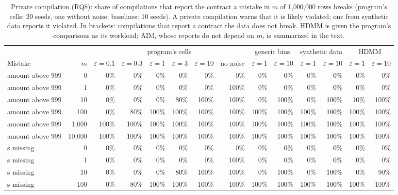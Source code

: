 \begin{table}[t]
\caption{Private compilation (RQ8): share of compilations that report the contract a mistake in $m$ of 1{,}000{,}000 rows breaks (program's cells: 20 seeds, one without noise; baselines: 10 seeds). A private compilation warns that it is likely violated; one from synthetic data reports it violated. In brackets: compilations that report a contract the data does not break. HDMM is given the program's comparisons as its workload; AIM, whose reports do not depend on $m$, is summarized in the text.}
\label{tab:rq-private-diag}
\centering
\footnotesize
\begin{adjustbox}{max width=\linewidth}
\begin{tabular}{@{}lrrrrrrrrrrrrr@{}}
\toprule
 & & \multicolumn{6}{c}{program's cells} & \multicolumn{2}{c}{generic bins} & \multicolumn{2}{c}{synthetic data} & \multicolumn{2}{c}{HDMM} \\
Mistake & $m$ & $\varepsilon = 0.1$ & $\varepsilon = 0.3$ & $\varepsilon = 1$ & $\varepsilon = 3$ & $\varepsilon = 10$ & no noise & $\varepsilon = 1$ & $\varepsilon = 10$ & $\varepsilon = 1$ & $\varepsilon = 10$ & $\varepsilon = 1$ & $\varepsilon = 10$ \\
\midrule
amount above 999 & 0 & 0\% & 0\% & 0\% & 0\% & 0\% & 0\% & 0\% & 0\% & 0\% & 0\% & 0\% & 0\% \\
amount above 999 & 1 & 0\% & 0\% & 0\% & 0\% & 0\% & 100\% & 0\% & 0\% & 0\% & 0\% & 0\% & 0\% \\
amount above 999 & 10 & 0\% & 0\% & 0\% & 80\% & 100\% & 100\% & 0\% & 100\% & 0\% & 100\% & 10\% & 100\% \\
amount above 999 & 100 & 0\% & 80\% & 100\% & 100\% & 100\% & 100\% & 100\% & 100\% & 100\% & 100\% & 100\% & 100\% \\
amount above 999 & 1,000 & 100\% & 100\% & 100\% & 100\% & 100\% & 100\% & 100\% & 100\% & 100\% & 100\% & 100\% & 100\% \\
amount above 999 & 10,000 & 100\% & 100\% & 100\% & 100\% & 100\% & 100\% & 100\% & 100\% & 100\% & 100\% & 100\% & 100\% \\
s missing & 0 & 0\% & 0\% & 0\% & 0\% & 0\% & 0\% & 0\% & 0\% & 0\% & 0\% & 0\% & 0\% \\
s missing & 1 & 0\% & 0\% & 0\% & 0\% & 0\% & 100\% & 0\% & 0\% & 0\% & 0\% & 0\% & 0\% \\
s missing & 10 & 0\% & 0\% & 0\% & 80\% & 100\% & 100\% & 0\% & 100\% & 0\% & 100\% & 0\% & 90\% \\
s missing & 100 & 0\% & 80\% & 100\% & 100\% & 100\% & 100\% & 100\% & 100\% & 100\% & 100\% & 100\% & 100\% \\

\end{tabular}
\end{adjustbox}
\end{table}
